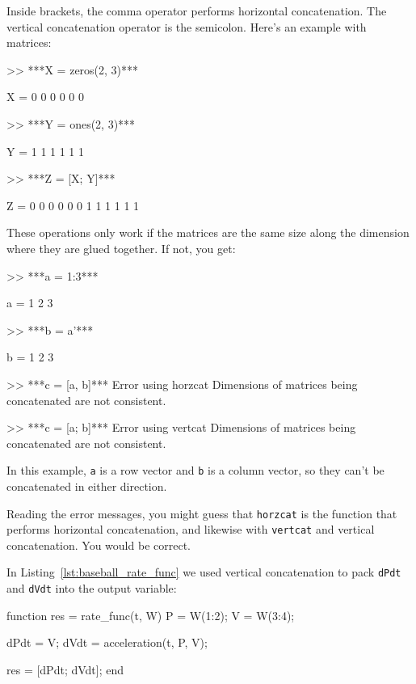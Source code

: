 Inside brackets, the comma operator performs horizontal concatenation.
The vertical concatenation operator is the semicolon.  Here's an
example with matrices:


\begin{code}
>> ***X = zeros(2, 3)***

X =  0     0     0
     0     0     0

>> ***Y = ones(2, 3)***

Y =  1     1     1
     1     1     1

>> ***Z = [X; Y]***

Z =  0     0     0
     0     0     0
     1     1     1
     1     1     1
\end{code}

These operations only work if the matrices are the same size along
the dimension where they are glued together.  If not, you get:

\begin{code}
>> ***a = 1:3***

a = 1     2     3

>> ***b = a'***

b =  1
     2
     3

>> ***c = [a, b]***
Error using horzcat
Dimensions of matrices being concatenated are not consistent.

>> ***c = [a; b]***
Error using vertcat
Dimensions of matrices being concatenated are not consistent.
\end{code}

In this example, \lstinline{a} is a row vector and \lstinline{b} is a column
vector, so they can't be concatenated in either direction.

Reading the error messages, you might guess that \lstinline{horzcat}
is the function that performs horizontal concatenation, and likewise
with \lstinline{vertcat} and vertical concatenation.  You would be correct.


In Listing~\ref{lst:baseball_rate_func} we used vertical concatenation to pack \lstinline{dPdt} and \lstinline{dVdt} into the output variable:

\begin{code}
function res = rate_func(t, W)
    P = W(1:2);
    V = W(3:4);

    dPdt = V;
    dVdt = acceleration(t, P, V);

    res = [dPdt; dVdt];
end
\end{code}

